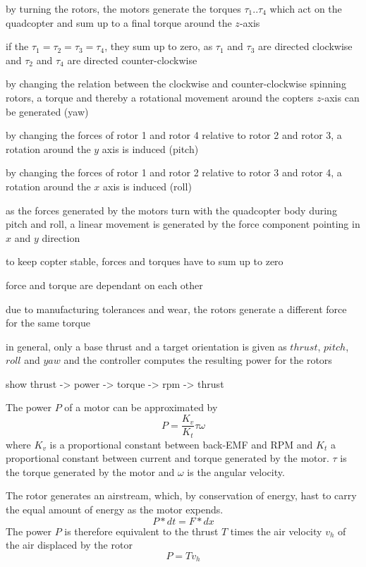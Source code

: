 \par{by turning the rotors, the motors generate the torques $\tau_1 .. \tau_4$ which act on the quadcopter and sum up to  a final torque around the $z$-axis}
\par{if the $\tau_1 = \tau_2 = \tau_3= \tau_4$, they sum up to zero, as $\tau_1$ and $\tau_3$ are directed clockwise and $\tau_2$ and $\tau_4$ are directed counter-clockwise}
\par{by changing the relation between the clockwise and counter-clockwise spinning rotors, a torque and thereby a rotational movement around the copters $z$-axis can be generated (yaw)}
\par{by changing the forces of rotor 1 and rotor 4 relative to rotor 2 and rotor 3, a rotation around the $y$ axis is induced (pitch)}
\par{by changing the forces of rotor 1 and rotor 2 relative to rotor 3 and rotor 4, a rotation around the $x$ axis is induced (roll)}
\par{as the forces generated by the motors turn with the quadcopter body during pitch and roll, a linear movement is generated by the force component pointing in $x$ and $y$ direction}
\par{to keep copter stable,  forces and torques have to sum up to zero}
\par{force and torque are dependant on each other}
\par{due to manufacturing tolerances and wear, the rotors generate a different force for the same torque}
\par{in general, only a base thrust and a target orientation is given as $thrust$, $pitch$, $roll$ and $yaw$ and the controller computes the resulting power for the rotors}
\par{ show thrust -> power -> torque -> rpm -> thrust}

The power $P$ of a motor can be approximated by
\begin{equation}
P = \frac{K_v}{K_t} \tau \omega
\end{equation}
where $K_v$ is a proportional constant between back-EMF and RPM and $K_t$ a proportional constant between current and torque generated by the motor. $\tau$ is the torque generated by the motor and $\omega$ is the angular velocity.

\cite{gibansky}

The rotor generates an airstream, which, by conservation of energy, hast to carry the equal amount of energy as the motor expends. 
\begin{equation}
P * dt = F* d x
\end{equation}
The power $P$ is therefore equivalent to the thrust $T$ times the air velocity $v_h$ of the air displaced by the rotor
\begin{equation}
P = T v_h
\end{equation}

